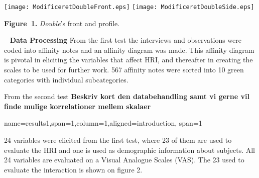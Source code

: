 \documentclass[paperwidth=160cm,paperheight=100cm,landscape,fontscale=0.2941]{baposter}
\begin{document}
\begin{poster}
{\begin{center}
\texttt{[image: ModificeretDoubleFront.eps]}
\texttt{[image: ModificeretDoubleSide.eps]}

\textbf{Figure~1. }\textit{Double}'s front and profile.
\end{center}
\vspace{-10pt}  


\textbullet~ \textbf{Data Processing}
From the first test the interviews and observations were coded into affinity notes and an affinity diagram was made. This affinity diagram is pivotal in eliciting the variables that affect HRI, and thereafter in creating the scales to be used for further work. 
567 affinity notes were sorted into 10 green categories with individual subcategories. 

From the second test \textbf{Beskriv kort den databehandling samt vi gerne vil finde mulige korrelationer mellem skalaer}
}


{name=results1,span=1,column=1,aligned=introduction, span=1}
{\parskip 5pt 
24 variables were elicited from the first test, where 23 of them are used to evaluate the HRI and one is used as demographic information about subjects. All 24 variables are evaluated on a Visual Analogue Scales (VAS). The 23 used to evaluate the interaction is shown on figure 2.
  
}
\end{poster}
\end{document}
